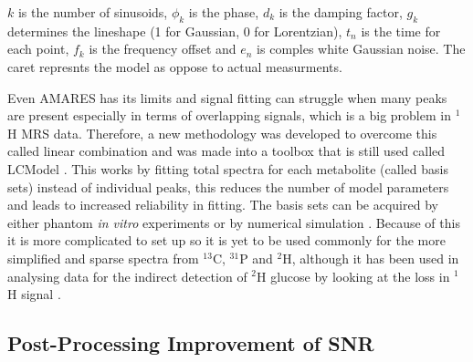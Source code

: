 \noindent $k$ is the number of sinusoids, $\phi_k$ is the phase, $d_k$ is the damping factor, $g_k$ determines the lineshape (1 for Gaussian, 0 for Lorentzian), $t_n$ is the time for each point, $f_k$ is the frequency offset and $e_n$ is comples white Gaussian noise. The caret represnts the model as oppose to actual measurments.

Even \ac{AMARES} has its limits and signal fitting can struggle when many peaks are present especially in terms of overlapping signals, which is a big problem in $^1$H \ac{MRS} data. Therefore, a new methodology was developed to overcome this called linear combination and was made into a toolbox that is still used called LCModel \cite{Provencher1993EstimationSpectra}. This works by fitting total spectra for each metabolite (called basis sets) instead of individual peaks, this reduces the number of model parameters and leads to increased reliability in fitting. The basis sets can be acquired by either phantom \textit{in vitro} experiments or by numerical simulation \cite{Near2021PreprocessingRecommendations}. Because of this it is more complicated to set up so it is yet to be used commonly for the more simplified and sparse spectra from $^{13}$C, $^{31}$P and $^2$H, although it has been used in analysing data for the indirect detection of $^2$H glucose by looking at the loss in $^1$H signal \cite{Rich20201HVivo,Cember2022IntegratingHumans,Niess2023Reproducibility3T}. 

\subsection{Post-Processing Improvement of SNR}

